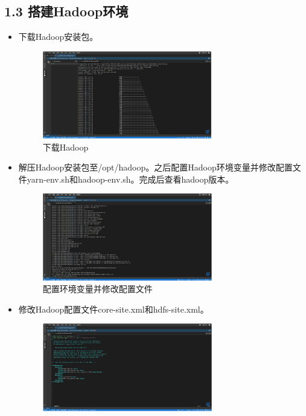 \documentclass{article}
\begin{document}
\subsection*{1.3 搭建Hadoop环境}
\begin{itemize}
    \item 下载Hadoop安装包。
          \begin{figure}[H]
              \centering
              \includegraphics[width=0.7\textwidth]{./pic/5.jpg}
              \caption{下载Hadoop}
          \end{figure}
    \item 解压Hadoop安装包至/opt/hadoop。之后配置Hadoop环境变量并修改配置文件yarn-env.sh和hadoop-env.sh。完成后查看hadoop版本。
          \begin{figure}[H]
              \centering
              \includegraphics[width=0.7\textwidth]{./pic/6.jpg}
              \caption{配置环境变量并修改配置文件}
          \end{figure}
    \item 修改Hadoop配置文件core-site.xml和hdfs-site.xml。
          \begin{figure}[H]
              \centering
              \includegraphics[width=0.7\textwidth]{./pic/7.jpg}

\end{figure}
\end{itemize}
\end{document}
